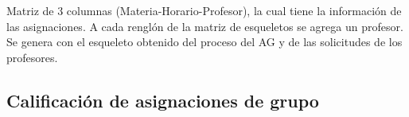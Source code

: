 Matriz de 3 columnas (Materia-Horario-Profesor), la cual tiene la información de las asignaciones. A cada renglón de la matriz de esqueletos se agrega un profesor. Se genera con el esqueleto obtenido del proceso del AG y de las solicitudes de los profesores.

\subsection{Calificación de asignaciones de grupo}


%
%
%
%





